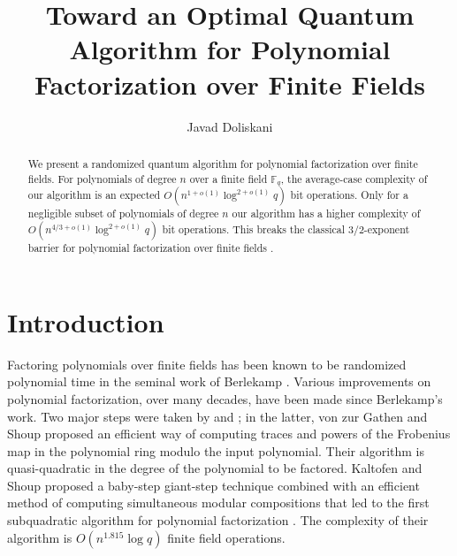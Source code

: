 \documentclass[11pt]{article}
\title{Toward an Optimal Quantum Algorithm for Polynomial Factorization over Finite Fields}
\author[1]{Javad Doliskani}
\affil[1]{\small Institute for Quantum Computing, University of Waterloo}
\date{}
\theoremstyle{plain}
\theoremstyle{definition}
\def\F{\ensuremath{\mathbb{F}}}
\begin{document}
\maketitle

\begin{abstract}
	We present a randomized quantum algorithm for polynomial factorization over finite fields. For 
	polynomials of degree $n$ over a finite field $\F_q$, the average-case complexity of our 
	algorithm is an expected $O(n^{1 + o(1)} \log^{2 + o(1)}q)$ bit operations. Only for a 
	negligible subset of polynomials of degree $n$ our algorithm has a higher complexity of $O(n^{4 
	/ 3 + o(1)} \log^{2 + o(1)}q)$ bit operations. This breaks the classical $3/2$-exponent 
	barrier for polynomial factorization over finite fields \cite{guo2016alg}.
\end{abstract}




\section{Introduction}
\label{sec:intro}

Factoring polynomials over finite fields has been known to be randomized polynomial time in the 
seminal work of Berlekamp \cite{Berlekamp70}. Various improvements on polynomial factorization, 
over many decades, have been made since Berlekamp's work. Two major steps were taken by 
\cite{cantor1981new} and \cite{von1992computing}; in the latter, von zur Gathen and Shoup proposed 
an efficient way of computing traces and powers of the Frobenius map in the polynomial ring modulo 
the input polynomial. Their algorithm is quasi-quadratic in the degree of the polynomial to be 
factored. Kaltofen and Shoup proposed a baby-step giant-step technique combined with an efficient 
method of computing simultaneous modular compositions that led to the first subquadratic algorithm 
for polynomial factorization \cite{KaSh98}. The complexity of their algorithm is $O(n^{1.815}\log 
q)$ finite field operations. 
\end{document}
